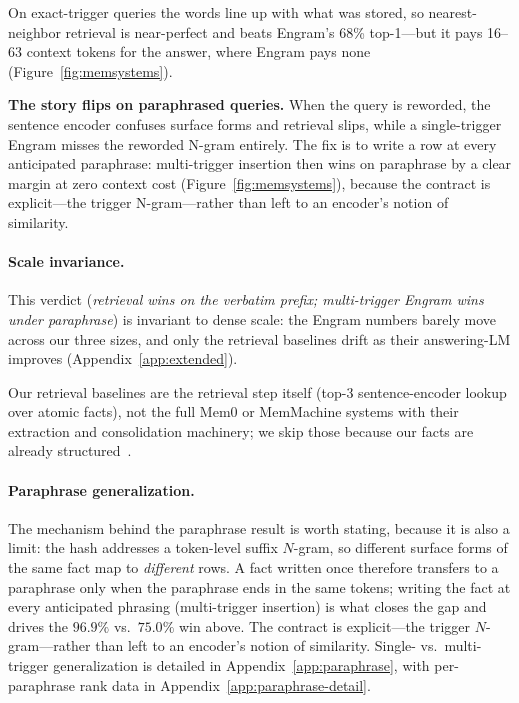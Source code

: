\documentclass[letterpaper]{article} %
\begin{document}
On exact-trigger queries the words line up with what was stored, so
nearest-neighbor retrieval is near-perfect and beats Engram's 68\%
top-1---but it pays 16--63 context tokens for the answer, where Engram
pays none (Figure~\ref{fig:memsystems}).

\textbf{The story flips on paraphrased queries.} When the query
is reworded, the sentence encoder confuses surface forms and
retrieval slips, while a single-trigger Engram misses the
reworded N-gram entirely. The fix is to write a row at every
anticipated paraphrase: multi-trigger insertion then wins on
paraphrase by a clear margin at zero context cost
(Figure~\ref{fig:memsystems}), because the contract is
explicit---the trigger N-gram---rather than left to an encoder's
notion of similarity.

\paragraph{Scale invariance.} This verdict (\emph{retrieval wins on
the verbatim prefix; multi-trigger Engram wins under paraphrase}) is
invariant to dense scale: the Engram numbers barely move across
our three sizes, and only the retrieval baselines drift as their
answering-LM improves (Appendix~\ref{app:extended}).

Our retrieval baselines are the retrieval step itself (top-3
sentence-encoder lookup over atomic facts), not the full Mem0 or
MemMachine systems with their extraction and consolidation
machinery; we skip those because our facts are already
structured~\citep{maharana2024locomo,wu2024longmemeval}.

\paragraph{Paraphrase generalization.}
\label{sec:paraphrase}
The mechanism behind the paraphrase result is worth stating, because
it is also a limit: the hash addresses a token-level suffix
$N$-gram, so different surface forms of the same fact map to
\emph{different} rows. A fact written once therefore transfers to a
paraphrase only when the paraphrase ends in the same tokens; writing
the fact at every anticipated phrasing (multi-trigger insertion) is
what closes the gap and drives the $96.9\%$ vs.\ $75.0\%$ win above.
The contract is explicit---the trigger $N$-gram---rather than left to
an encoder's notion of similarity. Single- vs.\ multi-trigger
generalization is detailed in Appendix~\ref{app:paraphrase}, with
per-paraphrase rank data in Appendix~\ref{app:paraphrase-detail}.
\end{document}
